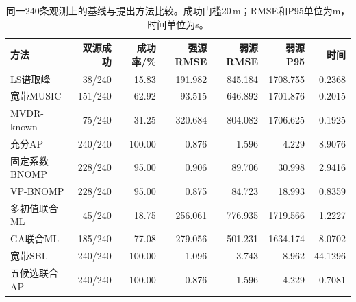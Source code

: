 \begin{table}[htbp]\centering\small
\caption{同一240条观测上的基线与提出方法比较。成功门槛20\,m；RMSE和P95单位为m，时间单位为s。}\label{tab:formalcommon}
\begin{tabular}{@{}lrrrrrr@{}}\toprule
方法 & 双源成功 & 成功率/\% & 强源RMSE & 弱源RMSE & 弱源P95 & 时间\\\midrule
LS谱取峰 & 38/240 & 15.83 & 191.982 & 845.184 & 1708.755 & 0.2368\\
宽带MUSIC & 151/240 & 62.92 & 93.515 & 646.892 & 1701.876 & 0.2015\\
MVDR-known & 75/240 & 31.25 & 320.684 & 804.082 & 1706.625 & 0.1925\\
充分AP & 240/240 & 100.00 & 0.876 & 1.596 & 4.229 & 8.9076\\
固定系数BNOMP & 228/240 & 95.00 & 0.906 & 89.706 & 30.998 & 2.9416\\
VP-BNOMP & 228/240 & 95.00 & 0.875 & 84.723 & 18.993 & 0.8359\\
多初值联合ML & 45/240 & 18.75 & 256.061 & 776.935 & 1719.566 & 1.2227\\
GA联合ML & 185/240 & 77.08 & 279.056 & 501.231 & 1634.174 & 8.0702\\
宽带SBL & 240/240 & 100.00 & 1.096 & 3.743 & 8.962 & 44.1296\\
五候选联合AP & 240/240 & 100.00 & 0.876 & 1.596 & 4.229 & 0.7081\\
\bottomrule\end{tabular}\end{table}
